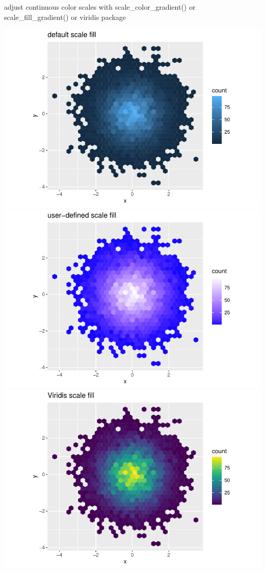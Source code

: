 \documentclass[
]{article}
\begin{document}
adjust continuous color scales with scale\_color\_gradient() or
scale\_fill\_gradient() or viridis package

\includegraphics{rmarkdown_tutorial_files/figure-latex/unnamed-chunk-28-1.pdf}
\includegraphics{rmarkdown_tutorial_files/figure-latex/unnamed-chunk-28-2.pdf}
\includegraphics{rmarkdown_tutorial_files/figure-latex/unnamed-chunk-28-3.pdf}
\end{document}
